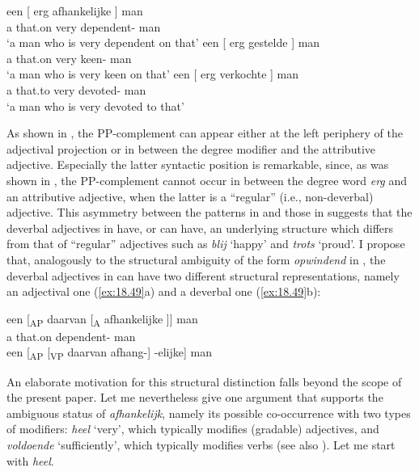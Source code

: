 \documentclass[output=paper]{langsci/langscibook}
\begin{document}
\ea%
    \label{ex:18.48}
	\ea
	\gll een [  erg  afhankelijke ] man\\
    a {} \phantom{〈}that.on very {} dependent-\Agr{} {} man\\
	\glt \enquote*{a man who is very dependent on that}
	\ex
	\gll een [  erg  gestelde ] man\\
    a {} \phantom{〈}that.on very {} keen-\Agr{} {} man\\
	\glt \enquote*{a man who is very keen on that}
	\ex
	\gll een [  erg  verkochte ] man\\
    a {} \phantom{〈}that.to very {} devoted-\Agr{} {} man\\
	\glt \enquote*{a man who is very devoted to that}
	\z
\z

As shown in , the PP-complement can appear either at the left
periphery of the adjectival projection or in between the degree modifier and
the attributive adjective. Especially the latter syntactic position is
remarkable, since, as was shown in , the PP-complement cannot
occur in between the degree word \emph{erg} and an attributive adjective, when
the latter is a \enquote{regular} (i.e., non-deverbal) adjective. This
asymmetry between the patterns in  and those in 
suggests that the deverbal adjectives in  have, or can have, an
underlying structure which differs from that of \enquote{regular} adjectives
such as \emph{blij} \enquote*{happy} and \emph{trots} \enquote*{proud}. I
propose that, analogously to the structural ambiguity of the form
\emph{opwindend} in , the deverbal adjectives in 
can have two different structural representations, namely an adjectival one
(\ref{ex:18.49}a) and a deverbal one (\ref{ex:18.49}b):

\ea%
    \label{ex:18.49}
	\ea
	\gll een [\textsubscript{AP} daarvan [\textsubscript{A} afhankelijke ]] man\\
        a {} that.on {} dependent-\Agr{} {} man\\
	\ex een [\textsubscript{AP} [\textsubscript{VP} daarvan afhang-] -elijke] man
	\z
\z

An elaborate motivation for this structural distinction falls beyond the scope
of the present paper. Let me nevertheless give one argument that supports the
ambiguous status of \emph{afhankelijk}, namely its possible co-occurrence with
two types of modifiers: \emph{heel} \enquote*{very}, which typically modifies
(gradable) adjectives, and \emph{voldoende} \enquote*{sufficiently}, which
typically modifies verbs (see also \citealt{Broekhuis2013}). Let me start with
\emph{heel}.
\end{document}
